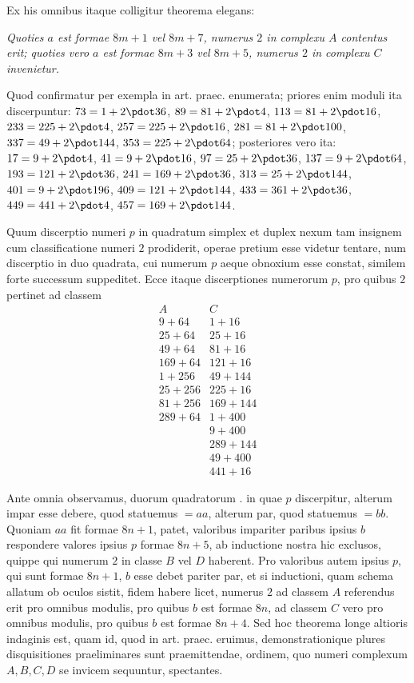 Ex his omnibus itaque colligitur theorema elegans:

\emph{Quoties $a$ est formae $8m+1$ vel $8m+7$, numerus $2$ in complexu $A$ contentus erit; quoties vero $a$ est formae $8m+3$ vel $8m+5$, numerus $2$ in complexu $C$ invenietur.}

Quod confirmatur per exempla in art. praec. enumerata; priores enim moduli ita discerpuntur: $73=1+2\pdot36$, $89=81+2\pdot4$, $113=81+2\pdot16$, $233=225+2\pdot4$, $257=225+2\pdot16$, $281=81+2\pdot100$, $337=49+2\pdot144$, $353=225+2\pdot64$; posteriores vero ita: $17=9+2\pdot4$, $41=9+2\pdot16$, $97=25+2\pdot36$, $137=9+2\pdot64$, $193=121+2\pdot36$, $241=169+2\pdot36$, $313=25+2\pdot144$, $401=9+2\pdot196$, $409=121+2\pdot144$, $433=361+2\pdot36$, $449=441+2\pdot4$, $457=169+2\pdot144$.

Quum discerptio numeri $p$ in quadratum simplex et duplex nexum tam insignem cum classificatione numeri $2$ prodiderit, operae pretium esse videtur tentare, num discerptio in duo quadrata, cui numerum $p$ aeque obnoxium esse constat, similem forte successum suppeditet. Ecce itaque discerptiones numerorum $p$, pro quibus $2$ pertinet ad classem
\[
\begin{array}{c|c}
A&C\\\hline
9+64&1+16\\
25+64&25+16\\
49+64&81+16\\
169+64&121+16\\
1+256&49+144\\
25+256&225+16\\
81+256&169+144\\
289+64&1+400\\
&9+400\\
&289+144\\
&49+400\\
&441+16
\end{array}
\]

%
Ante omnia observamus, duorum quadratorum . in quae $p$ discerpitur, alterum impar esse debere, quod statuemus $=aa$, alterum par, quod statuemus $=bb$. Quoniam $aa$ fit formae $8n+1$, patet, valoribus impariter paribus ipsius $b$ respondere valores ipsius $p$ formae $8n+5$, ab inductione nostra hic exclusos, quippe qui numerum $2$ in classe $B$ vel $D$ haberent. Pro valoribus autem ipsius $p$, qui sunt formae $8n+1$, $b$ esse debet pariter par, et si inductioni, quam schema allatum ob oculos sistit, fidem habere licet, numerus $2$ ad classem $A$ referendus erit pro omnibus modulis, pro quibus $b$ est formae $8n$, ad classem $C$ vero pro omnibus modulis, pro quibus $b$ est formae $8n+4$. Sed hoc theorema longe altioris indaginis est, quam id, quod in art. praec. eruimus, demonstrationique plures disquisitiones praeliminares sunt praemittendae, ordinem, quo numeri complexum $A,B,C,D$ se invicem sequuntur, spectantes.

